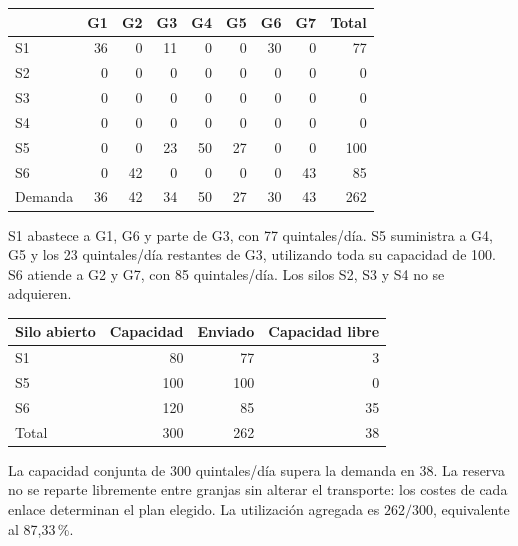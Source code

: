 \documentclass[11pt,a4paper]{article}
\begin{document}
\begin{center}\small\begin{tabular}{lrrrrrrrr}\toprule
 & G1 & G2 & G3 & G4 & G5 & G6 & G7 & Total \\\midrule
S1 & 36 & 0 & 11 & 0 & 0 & 30 & 0 & 77 \\
S2 & 0 & 0 & 0 & 0 & 0 & 0 & 0 & 0 \\
S3 & 0 & 0 & 0 & 0 & 0 & 0 & 0 & 0 \\
S4 & 0 & 0 & 0 & 0 & 0 & 0 & 0 & 0 \\
S5 & 0 & 0 & 23 & 50 & 27 & 0 & 0 & 100 \\
S6 & 0 & 42 & 0 & 0 & 0 & 0 & 43 & 85 \\
\midrule
Demanda & 36 & 42 & 34 & 50 & 27 & 30 & 43 & 262 \\
\bottomrule\end{tabular}\end{center}

S1 abastece a G1, G6 y parte de G3, con 77 quintales/día. S5 suministra a G4, G5 y los
23 quintales/día restantes de G3, utilizando toda su capacidad de 100. S6 atiende a G2
y G7, con 85 quintales/día. Los silos S2, S3 y S4 no se adquieren.

\begin{center}\begin{tabular}{lrrr}\toprule
Silo abierto & Capacidad & Enviado & Capacidad libre \\\midrule
S1 & 80 & 77 & 3 \\
S5 & 100 & 100 & 0 \\
S6 & 120 & 85 & 35 \\\midrule
Total & 300 & 262 & 38 \\\bottomrule
\end{tabular}\end{center}

La capacidad conjunta de 300 quintales/día supera la demanda en 38. La reserva no se
reparte libremente entre granjas sin alterar el transporte: los costes de cada enlace
determinan el plan elegido. La utilización agregada es $262/300$, equivalente al 87,33\,\%.

\newpage
\end{document}

